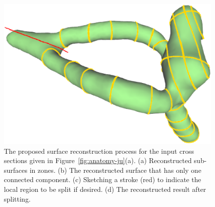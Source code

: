 \begin{figure} [htbp]
{\begin{minipage}[b]{0.23\textwidth}
      \includegraphics[scale=0.14]{figs/f6.anatomy-split.eps}%
    \end{minipage}}
  \caption{The proposed surface reconstruction process for the input cross sections given in Figure~\ref{fig:anatomy-ju}(a).
  (a) Reconstructed sub-surfaces in zones.
  (b) The reconstructed surface that has only one connected component.
  (c) Sketching a stroke (red) to indicate the local region to be split if desired.
  (d) The reconstructed result after splitting. }
  \label{fig:anatomy}
\end{figure}

